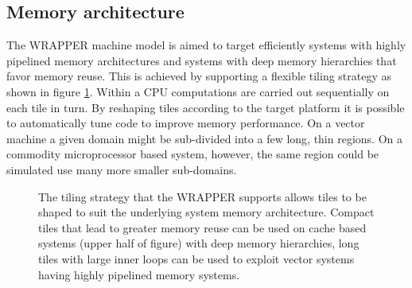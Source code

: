 \subsection{Memory architecture}

The WRAPPER machine model is aimed to target efficiently systems with
highly pipelined memory architectures and systems with deep memory
hierarchies that favor memory reuse. This is achieved by supporting a 
flexible tiling strategy as shown in figure \ref{fig:tiling-strategy}. 
Within a CPU computations are carried out sequentially on each tile
in turn. By reshaping tiles according to the target platform it is 
possible to automatically tune code to improve memory performance.
On a vector machine a given domain might be sub-divided into a few
long, thin regions. On a commodity microprocessor based system, however,
the same region could be simulated use many more smaller
sub-domains.


\begin{figure}
\begin{center}
\end{center}
\caption{The tiling strategy that the WRAPPER supports allows tiles
to be shaped to suit the underlying system memory architecture.
Compact tiles that lead to greater memory reuse can be used on cache
based systems (upper half of figure) with deep memory hierarchies, long tiles 
with large inner loops can be used to exploit vector systems having
highly pipelined memory systems.
} \label{fig:tiling-strategy}
\end{figure}

